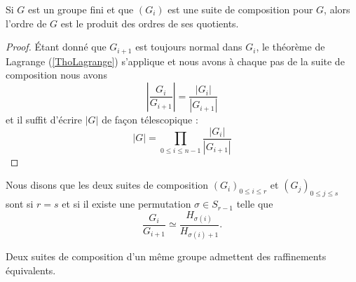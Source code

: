 \begin{proposition}
    Si \( G\) est un groupe fini et que \( (G_i)\) est une suite de composition pour \( G\), alors l'ordre de \( G\) est le produit des ordres de ses quotients.
\end{proposition}

\begin{proof}
    Étant donné que \( G_{i+1}\) est toujours normal dans \( G_i\), le théorème de Lagrange (\ref{ThoLagrange}) s'applique et nous avons à chaque pas de la suite de composition nous avons
    \begin{equation}
        | \frac{ G_i }{ G_{i+1} } |=\frac{ | G_i | }{ | G_{i+1} | } 
    \end{equation}
    et il suffit d'écrire \( | G |\) de façon télescopique :
    \begin{equation}
        | G |=\prod_{0\leq i\leq n-1}\frac{ | G_i | }{ | G_{i+1} | }
    \end{equation}
\end{proof}

Nous disons que les deux suites de composition \( (G_i)_{0\leq i\leq r}\) et \( (G_j)_{0\leq j\leq s}\) sont  si \( r=s\) et si il existe une permutation \( \sigma\in S_{r-1}\) telle que
\begin{equation}
    \frac{ G_i }{ G_{i+1} }\simeq\frac{ H_{\sigma(i)} }{ H_{\sigma(i)+1} }.
\end{equation}

\begin{proposition}[Schreider]
    Deux suites de composition d'un même groupe admettent des raffinements équivalents.
\end{proposition}

